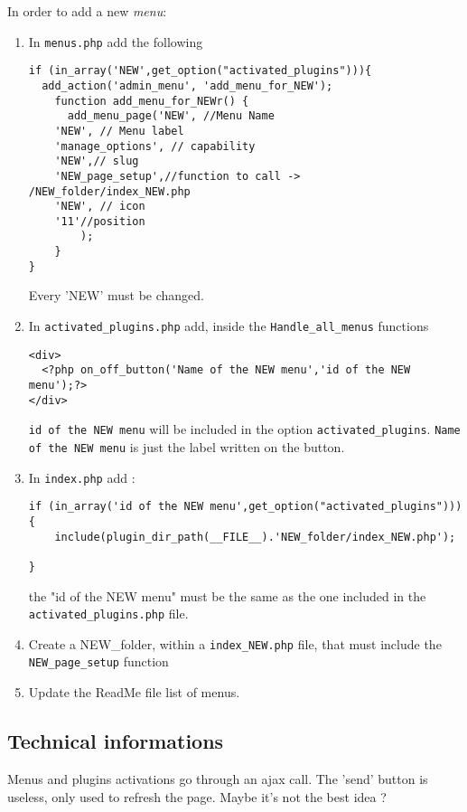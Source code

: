 \documentclass[11pt]{article}
\begin{document}
In order to add a new \emph{menu}:
\begin{enumerate}
\item In \texttt{menus.php} add the following 
\begin{lstlisting}
if (in_array('NEW',get_option("activated_plugins"))){
  add_action('admin_menu', 'add_menu_for_NEW');
    function add_menu_for_NEWr() {
      add_menu_page('NEW', //Menu Name
	'NEW', // Menu label
	'manage_options', // capability
	'NEW',// slug
	'NEW_page_setup',//function to call -> /NEW_folder/index_NEW.php
	'NEW', // icon
	'11'//position
	 	);
	}
}
\end{lstlisting}
Every 'NEW' must be changed. 

\item In \texttt{activated\_plugins.php} add, inside the \texttt{Handle\_all\_menus} functions
\begin{lstlisting}
<div>
  <?php on_off_button('Name of the NEW menu','id of the NEW menu');?>
</div>
\end{lstlisting}
\texttt{id of the NEW menu}  will be included in the option \texttt{activated\_plugins}.
\texttt{Name of the NEW menu} is just the label written on the button. 
\item In \texttt{index.php} add :
\begin{lstlisting}
if (in_array('id of the NEW menu',get_option("activated_plugins"))){
	include(plugin_dir_path(__FILE__).'NEW_folder/index_NEW.php');

}
\end{lstlisting}
the "id of the NEW menu" must be the same as the one included in the  \texttt{activated\_plugins.php} file. 

\item Create a NEW\_folder, within a \texttt{index\_NEW.php} file, that must include the \texttt{NEW\_page\_setup} function

\item Update the ReadMe file list of menus. 

\end{enumerate}

\subsection{Technical informations}
Menus and plugins activations go through an ajax call. The 'send' button is useless, only used to refresh the page. Maybe it's not the best idea ? 
\end{document}
